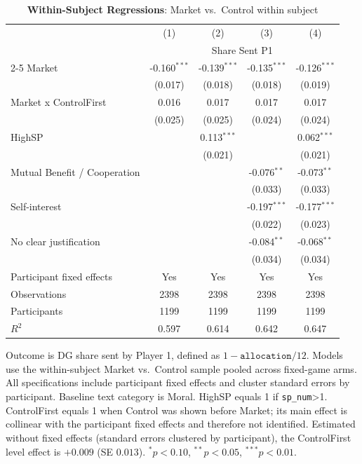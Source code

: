 \begin{table}[!htbp]
\centering
\caption{\textbf{Within-Subject Regressions}: Market vs.\ Control within subject}
\label{tab:within_market_regressions}
\begin{tabular}{lcccc}
\toprule
 & (1) & (2) & (3) & (4) \\
 & \multicolumn{4}{c}{Share Sent P1} \\
\cmidrule(lr){2-5}
\midrule
Market & -0.160$^{***}$ & -0.139$^{***}$ & -0.135$^{***}$ & -0.126$^{***}$ \\
 & (0.017) & (0.018) & (0.018) & (0.019) \\
Market x ControlFirst & 0.016 & 0.017 & 0.017 & 0.017 \\
 & (0.025) & (0.025) & (0.024) & (0.024) \\
HighSP &  & 0.113$^{***}$ &  & 0.062$^{***}$ \\
 &  & (0.021) &  & (0.021) \\
Mutual Benefit / Cooperation &  &  & -0.076$^{**}$ & -0.073$^{**}$ \\
 &  &  & (0.033) & (0.033) \\
Self-interest &  &  & -0.197$^{***}$ & -0.177$^{***}$ \\
 &  &  & (0.022) & (0.023) \\
No clear justification &  &  & -0.084$^{**}$ & -0.068$^{**}$ \\
 &  &  & (0.034) & (0.034) \\
Participant fixed effects & Yes & Yes & Yes & Yes \\
Observations & 2398 & 2398 & 2398 & 2398 \\
Participants & 1199 & 1199 & 1199 & 1199 \\
$R^2$ & 0.597 & 0.614 & 0.642 & 0.647 \\
\bottomrule
\end{tabular}
\begin{flushleft}
\footnotesize Outcome is DG share sent by Player 1, defined as $1-\texttt{allocation}/12$. Models use the within-subject Market vs.\ Control sample pooled across fixed-game arms. All specifications include participant fixed effects and cluster standard errors by participant. Baseline text category is Moral. HighSP equals 1 if \texttt{sp\_num}>1. ControlFirst equals 1 when Control was shown before Market; its main effect is collinear with the participant fixed effects and therefore not identified. Estimated without fixed effects (standard errors clustered by participant), the ControlFirst level effect is $+0.009$ (SE $0.013$). $^{*}p<0.10$, $^{**}p<0.05$, $^{***}p<0.01$.
\end{flushleft}
\end{table}